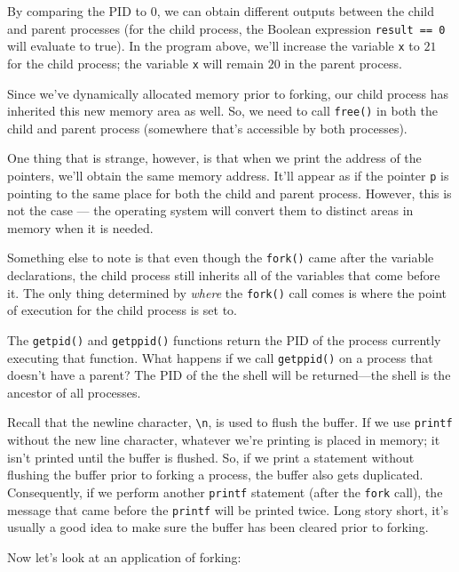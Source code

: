 By comparing the PID to $0$, we can obtain different outputs between the child and parent processes (for the child process, the Boolean expression \verb!result == 0! will evaluate to true). In the program above, we'll increase the variable \verb!x! to $21$ for the child process; the variable \verb!x! will remain $20$ in the parent process. 


Since we've dynamically allocated memory prior to forking, our child process has inherited this new memory area as well. So, we need to call \verb!free()! in both the child and parent process (somewhere that's accessible by both processes). 

One thing that is strange, however, is that when we print the address of the pointers, we'll obtain the same memory address. It'll appear as if the pointer \verb!p! is pointing to the same place for both the child and parent process. However, this is not the case --- the operating system will convert them to distinct areas in memory when it is needed.


Something else to note is that even though the \verb!fork()! came after the variable declarations, the child process still inherits all of the variables that come before it. The only thing determined by \textit{where} the \verb!fork()! call comes is where the point of execution for the child process is set to.


The \verb!getpid()! and \verb!getppid()! functions return the PID of the process currently executing that function. What happens if we call \verb!getppid()! on a process that doesn't have a parent? The PID of the the shell will be returned---the shell is the ancestor of all processes.


Recall that the newline character, \verb!\n!, is used to flush the buffer. If we use \verb!printf! without the new line character, whatever we're printing is placed in memory; it isn't printed until the buffer is flushed. So, if we print a statement without flushing the buffer prior to forking a process, the buffer also gets duplicated. Consequently, if we perform another \verb!printf! statement (after the \verb!fork! call), the message that came before the \verb!printf! will be printed twice. Long story short, it's usually a good idea to make sure the buffer has been cleared prior to forking. 


Now let's look at an application of forking:

